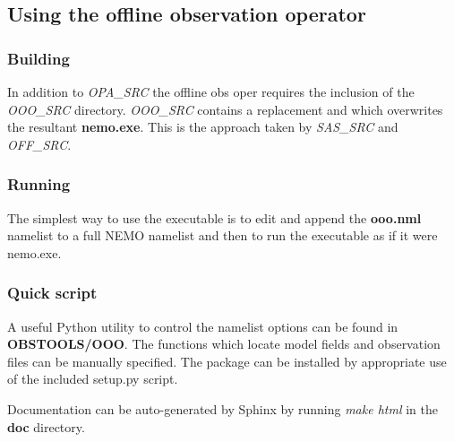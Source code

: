 \documentclass[../main/NEMO_manual]{subfiles}
\begin{document}

\subsection{Using the offline observation operator}

\subsubsection{Building}

In addition to \emph{OPA\_SRC} the offline obs oper requires the inclusion of the \emph{OOO\_SRC} directory.
\emph{OOO\_SRC} contains a replacement  and  which
overwrites the resultant \textbf{nemo.exe}.
This is the approach taken by \emph{SAS\_SRC} and \emph{OFF\_SRC}.

\subsubsection{Running}

The simplest way to use the executable is to edit and append the \textbf{ooo.nml} namelist to
a full NEMO namelist and then to run the executable as if it were nemo.exe. 

\subsubsection{Quick script}

A useful Python utility to control the namelist options can be found in \textbf{OBSTOOLS/OOO}.
The functions which locate model fields and observation files can be manually specified.
The package can be installed by appropriate use of the included setup.py script.

Documentation can be auto-generated by Sphinx by running \emph{make html} in the \textbf{doc} directory.

\end{document}
